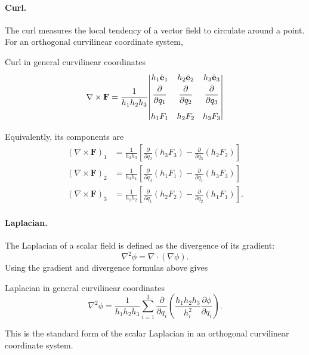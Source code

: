 		\paragraph{Curl.}

			The curl measures the local tendency of a vector field to circulate around a point. For an orthogonal curvilinear coordinate system,
			\begin{definition}{Curl in general curvilinear coordinates}
			\begin{equation}\label{eq:curl_general}
				\nabla\times\mathbf F
				=
				\frac{1}{h_1h_2h_3}
				\abs{\mqty{
					h_1\hat{\mathbf e}_1 &
					h_2\hat{\mathbf e}_2 &
					h_3\hat{\mathbf e}_3 \\[3pt]
					\dfrac{\partial}{\partial q_1} &
					\dfrac{\partial}{\partial q_2} &
					\dfrac{\partial}{\partial q_3} \\[14pt]
					h_1F_1 &
					h_2F_2 &
					h_3F_3
				}}
			\end{equation}
			\end{definition}
			
			Equivalently, its components are
			\begin{align}
				(\nabla\times\mathbf F)_1
				&=
				\frac{1}{h_2h_3}
				\left[
				\frac{\partial}{\partial q_2}(h_3F_3)
				-
				\frac{\partial}{\partial q_3}(h_2F_2)
				\right]\\
				(\nabla\times\mathbf F)_2
				&=
				\frac{1}{h_3h_1}
				\left[
				\frac{\partial}{\partial q_3}(h_1F_1)
				-
				\frac{\partial}{\partial q_1}(h_3F_3)
				\right]\\
				(\nabla\times\mathbf F)_3
				&=
				\frac{1}{h_1h_2}
				\left[
				\frac{\partial}{\partial q_1}(h_2F_2)
				-
				\frac{\partial}{\partial q_2}(h_1F_1)
				\right].
			\end{align}

		\paragraph{Laplacian.}

			The Laplacian of a scalar field is defined as the divergence of its gradient:
			\[
				\nabla^2\phi
				=
				\nabla\cdot(\nabla\phi).
			\]
			Using the gradient and divergence formulas above gives
			\begin{definition}{Laplacian in general curvilinear coordinates}
				\begin{equation}\label{eq:lap_general}
					\nabla^2\phi
					=
					\frac{1}{h_1h_2h_3}
					\sum_{i=1}^3
					\frac{\partial}{\partial q_i}
					\left(
					\frac{h_1h_2h_3}{h_i^2}
					\frac{\partial\phi}{\partial q_i}
					\right).
				\end{equation}
			\end{definition}
			This is the standard form of the scalar Laplacian in an orthogonal curvilinear coordinate system.

